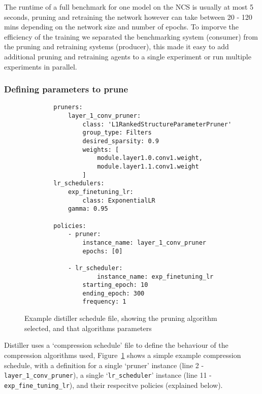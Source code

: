 \documentclass[../Dissertation.tex]{subfiles}
\begin{document}
The runtime of a full benchmark for one model on the NCS is usually at most 5 seconds, pruning and retraining the network however can take between 20 - 120 mins depending on the network size and number of epochs. 
To imporve the efficiency of the training we separated the benchmarking system (consumer) from the pruning and retraining systems (producer), this made it easy to add additional pruning and retraining agents to a single experiment or run multiple experiments in parallel.

\subsubsection{Defining parameters to prune}

\singlespacing
\begin{figure}[H]
    \begin{verbatim}
        pruners: 
            layer_1_conv_pruner:
                class: 'L1RankedStructureParameterPruner'
                group_type: Filters
                desired_sparsity: 0.9
                weights: [
                    module.layer1.0.conv1.weight,
                    module.layer1.1.conv1.weight
                ]
        lr_schedulers:
            exp_finetuning_lr:
                class: ExponentialLR
            gamma: 0.95

        policies:
            - pruner:
                instance_name: layer_1_conv_pruner
                epochs: [0]
            
            - lr_scheduler:
                    instance_name: exp_finetuning_lr
                starting_epoch: 10
                ending_epoch: 300
                frequency: 1
    \end{verbatim}
    \caption{Example distiller schedule file, showing the pruning algorithm selected, and that algorithms parameters}
    \label{fig:CompressionSchedule}
\end{figure}
\doublespacing

Distiller uses a `compression schedule' file to define the behaviour of the compression algorithms used, Figure~\ref{fig:CompressionSchedule} shows a simple example compression schedule, with a definition for a single `pruner' instance (line 2 - \texttt{\color{mintedgreen}layer\_1\_conv\_pruner}), a single `\texttt{\color{mintedgreen}lr\_scheduler}' instance (line 11 - \texttt{\color{mintedgreen}exp\_fine\_tuning\_lr}), and their respecitve policies (explained below).
\end{document}
